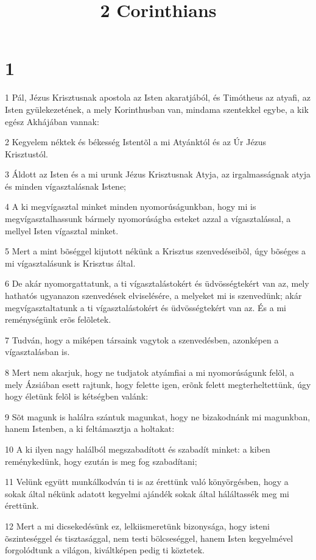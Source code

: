 

\title{2 Corinthians}


\chapter{1}

\par 1 Pál, Jézus Krisztusnak apostola az Isten akaratjából, és Timótheus az atyafi, az Isten gyülekezetének, a mely Korinthusban van, mindama szentekkel egybe, a kik egész Akhájában vannak:
\par 2 Kegyelem néktek és békesség Istentõl a mi Atyánktól és az Úr Jézus Krisztustól.
\par 3 Áldott az Isten és a mi urunk Jézus Krisztusnak Atyja, az irgalmasságnak atyja és minden  vígasztalásnak Istene;
\par 4 A ki megvígasztal minket minden nyomorúságunkban, hogy mi is megvígasztalhassunk bármely nyomorúságba esteket azzal a vígasztalással, a mellyel Isten vígasztal minket.
\par 5 Mert a mint bõséggel kijutott nékünk a Krisztus szenvedéseibõl,  úgy bõséges a mi vígasztalásunk is Krisztus által.
\par 6 De akár nyomorgattatunk, a ti vígasztalástokért és üdvösségtekért van az, mely hathatós ugyanazon szenvedések elviselésére, a melyeket mi is szenvedünk; akár megvígasztaltatunk a ti vígasztalástokért és üdvösségtekért van az. És a mi reménységünk erõs felõletek.
\par 7 Tudván, hogy a miképen társaink vagytok a szenvedésben, azonképen a vígasztalásban is.
\par 8 Mert nem akarjuk, hogy ne tudjatok atyámfiai a mi nyomorúságunk felõl, a mely Ázsiában esett rajtunk, hogy felette igen, erõnk felett megterheltettünk, úgy hogy életünk felõl is kétségben valánk:
\par 9 Sõt magunk is halálra szántuk magunkat, hogy ne bizakodnánk mi magunkban, hanem Istenben, a ki feltámasztja a holtakat:
\par 10 A ki ilyen nagy halálból megszabadított és szabadít minket: a kiben reménykedünk, hogy ezután is meg fog szabadítani;
\par 11 Velünk együtt munkálkodván ti is az érettünk való könyörgésben, hogy a sokak által nékünk adatott kegyelmi ajándék sokak által háláltassék meg mi érettünk.
\par 12 Mert a mi dicsekedésünk ez, lelkiismeretünk bizonysága, hogy isteni õszinteséggel  és tisztasággal, nem testi bölcseséggel, hanem Isten kegyelmével forgolódtunk a világon, kiváltképen pedig ti köztetek.
